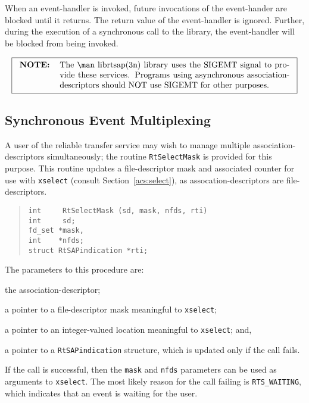 When an event-handler is invoked,
future invocations of the event-hander are blocked until it returns.
The return value of the event-handler is ignored.
Further,
during the execution of a synchronous call to the library,
the event-handler will be blocked from being invoked.

\[\fbox{\begin{tabular}{lp{0.8\textwidth}}
\bf NOTE:&	The \man librtsap(3n) library uses the SIGEMT signal to
		provide these services.
		Programs using asynchronous association-descriptors should NOT
		use SIGEMT for other purposes.
\end{tabular}}\]

\subsection     {Synchronous Event Multiplexing}
A user of the reliable transfer service may wish to manage multiple
asso\-ci\-ation-descriptors simultaneously;
the routine \verb"RtSelectMask" is provided for this purpose.
This routine updates a file-descriptor mask and associated counter for use
with \verb"xselect" (consult Section~\ref{acs:select}),
as assocation-descriptors are file-descriptors.
\begin{quote}\small\begin{verbatim}
int     RtSelectMask (sd, mask, nfds, rti)
int     sd;
fd_set *mask,
int    *nfds;
struct RtSAPindication *rti;
\end{verbatim}\end{quote}
The parameters to this procedure are:
\begin{describe}
\item[\verb"sd":] the association-descriptor;

\item[\verb"mask":] a pointer to a file-descriptor mask meaningful to
\verb"xselect";

\item[\verb"nfds":] a pointer to an integer-valued location meaningful to
\verb"xselect";
and,

\item[\verb"rti":] a pointer to a \verb"RtSAPindication" structure, which is
updated only if the call fails.
\end{describe}
If the call is successful, then the \verb"mask" and \verb"nfds" parameters can
be used as arguments to \verb"xselect".
The most likely reason for the call failing is \verb"RTS_WAITING",
which indicates that an event is waiting for the user.

